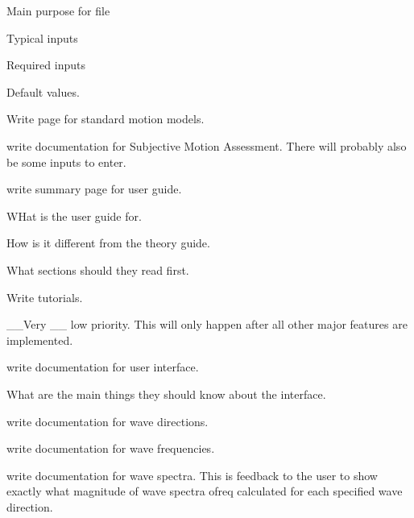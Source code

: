 \begin{DoxyRefList}
\begin{DoxyItemize}
\item Main purpose for file
\item Typical inputs
\item Required inputs
\item Default values. 
\end{DoxyItemize}
\item[\label{todo__todo000042}%
\hypertarget{todo__todo000042}{}%
Page \hyperlink{standard_motion_models}{Standard Motion Models} ]Write page for standard motion models. 
\item[\label{todo__todo000028}%
\hypertarget{todo__todo000028}{}%
Page \hyperlink{local_sma}{Subjective Motion Assessment} ]write documentation for Subjective Motion Assessment. There will probably also be some inputs to enter. 
\item[\label{todo__todo000014}%
\hypertarget{todo__todo000014}{}%
page \hyperlink{index}{Summary} ]write summary page for user guide.
\begin{DoxyItemize}
\item W\-Hat is the user guide for.
\item How is it different from the theory guide.
\item What sections should they read first. 
\end{DoxyItemize}
\item[\label{todo__todo000036}%
\hypertarget{todo__todo000036}{}%
Page \hyperlink{tutorials}{Tutorials} ]Write tutorials.
\begin{DoxyItemize}
\item \-\_\-\-\_\-\-Very \-\_\-\-\_\- low priority. This will only happen after all other major features are implemented. 
\end{DoxyItemize}
\item[\label{todo__todo000038}%
\hypertarget{todo__todo000038}{}%
Page \hyperlink{user_interface}{User Interface} ]write documentation for user interface.
\begin{DoxyItemize}
\item What are the main things they should know about the interface. 
\end{DoxyItemize}
\item[\label{todo__todo000031}%
\hypertarget{todo__todo000031}{}%
Page \hyperlink{wave_directions}{Wave Directions} ]write documentation for wave directions.  
\item[\label{todo__todo000032}%
\hypertarget{todo__todo000032}{}%
Page \hyperlink{wave_frequencies}{Wave Frequencies} ]write documentation for wave frequencies.  
\item[\label{todo__todo000033}%
\hypertarget{todo__todo000033}{}%
Page \hyperlink{output_wave_spectra}{Wave Spectra} ]write documentation for wave spectra. This is feedback to the user to show exactly what magnitude of wave spectra ofreq calculated for each specified wave direction.
\end{DoxyRefList}